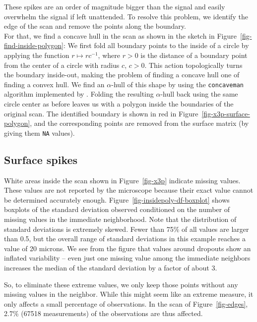 \documentclass[
  authoryear,
  preprint,
  5p,
  twocolumn]{elsarticle}
\begin{document}
These spikes are an order of magnitude bigger than the signal and easily
overwhelm the signal if left unattended. To resolve this problem, we
identify the edge of the scan and remove the points along the
boundary.\\
For that, we find a concave hull in the scan as shown in the sketch in
Figure~\ref{fig-find-inside-polygon}: We first fold all boundary points
to the inside of a circle by applying the function
\(r \mapsto rc^{-1}\), where \(r > 0\) is the distance of a boundary
point from the center of a circle with radius \(c\), \(c > 0\). This
action topologically turns the boundary inside-out, making the problem
of finding a concave hull one of finding a convex hull. We find an
\(\alpha\)-hull of this shape by using the \texttt{concaveman} algorithm
implemented by \citet{gombinConcavemanVeryFast2020}. Folding the
resulting \(\alpha\)-hull back using the same circle center as before
leaves us with a polygon inside the boundaries of the original scan. The
identified boundary is shown in red in
Figure~\ref{fig-x3p-surface-polygon}, and the corresponding points are
removed from the surface matrix (by giving them \texttt{NA} values).

\subsection{Surface spikes}\label{sec-Extremevalues}

White areas inside the scan shown in Figure~\ref{fig-x3p} indicate
missing values. These values are not reported by the microscope because
their exact value cannot be determined accurately enough.
Figure~\ref{fig-insidepoly-df-boxplot} shows boxplots of the standard
deviation observed conditioned on the number of missing values in the
immediate neighborhood. Note that the distribution of standard
deviations is extremely skewed. Fewer than 75\% of all values are larger
than 0.5, but the overall range of standard deviations in this example
reaches a value of 20 microns. We see from the figure that values around
dropouts show an inflated variability -- even just one missing value
among the immediate neighbors increases the median of the standard
deviation by a factor of about 3.

So, to eliminate these extreme values, we only keep those points without
any missing values in the neighbor. While this might seem like an
extreme measure, it only affects a small percentage of observations. In
the scan of Figure~\ref{fig-edges}, 2.7\% (67518 measurements) of the
observations are thus affected.
\end{document}
